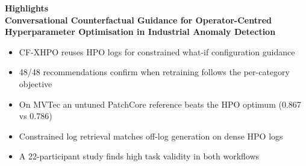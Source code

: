 \documentclass[12pt]{article}
\begin{document}
\begin{center}
  {\large\bfseries Highlights}\\[6pt]
  {\bfseries Conversational Counterfactual Guidance for Operator-Centred\\
  Hyperparameter Optimisation in Industrial Anomaly Detection}
\end{center}

\vspace{6pt}

\begin{itemize}[leftmargin=*, itemsep=6pt, topsep=0pt]
  \item CF-XHPO reuses HPO logs for constrained what-if configuration guidance
  \item 48/48 recommendations confirm when retraining follows the per-category objective
  \item On MVTec an untuned PatchCore reference beats the HPO optimum (0.867 vs 0.786)
  \item Constrained log retrieval matches off-log generation on dense HPO logs
  \item A 22-participant study finds high task validity in both workflows
\end{itemize}
\end{document}

